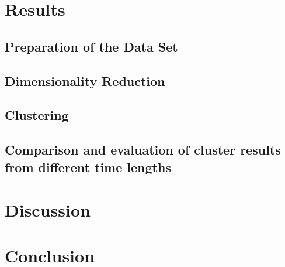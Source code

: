 \section{Results}
\label{section:Experiment}


  \subsection{Preparation of the Data Set}
  \label{section:ExperimentPreparationDataSet}
  

  \subsection{Dimensionality Reduction}
  \label{section:DimensionalityReduction}
  

  \subsection{Clustering}
  \label{section:ExperimentClustering}
  

  \subsection{Comparison and evaluation of cluster results from different time lengths}
  \label{section:ExperimentComparisonTimeLengths}
  
  
  
  


\section{Discussion}
\label{section:Discussion}




\section{Conclusion}
\label{section:Conclusion}






